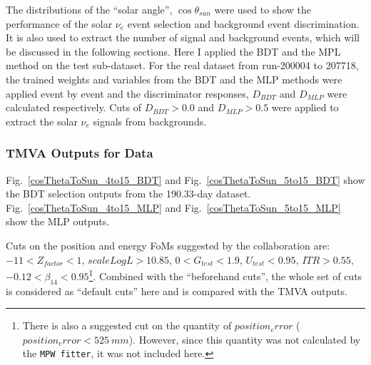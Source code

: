 The distributions of the ``solar angle'', $\cos\theta_{sun}$ were used to show the performance of the solar $\nu_e$ event selection and background event discrimination. It is also used to extract the number of signal and background events, which will be discussed in the following sections. Here I applied the BDT and the MPL method on the test sub-dataset. For the real dataset from run-200004 to 207718, the trained weights and variables from the BDT and the MLP methods were applied event by event and the discriminator responses, $D_{BDT}$ and $D_{MLP}$ were calculated respectively. Cuts of $D_{BDT}>0.0$ and $D_{MLP}>0.5$ were applied to extract the solar $\nu_e$ signals from backgrounds. 
 

%

\subsubsection{TMVA Outputs for Data}

Fig.~\ref{cosThetaToSun_4to15_BDT} and Fig.~\ref{cosThetaToSun_5to15_BDT} show the BDT selection outputs from the 190.33-day dataset. Fig.~\ref{cosThetaToSun_4to15_MLP} and Fig.~\ref{cosThetaToSun_5to15_MLP} show the MLP outputs. 


Cuts on the position and energy FoMs suggested by the collaboration\cite{morganFOM} are: $-11<Z_{factor}<1$, $scaleLogL>10.85$, $0<G_{test}<1.9$, $U_{test}<0.95$, $ITR>0.55$, $-0.12<\beta_{14}<0.95$\footnote{There is also a suggested cut on the quantity of $position_error$ ($position_error<525~mm$). However, since this quantity was not calculated by the \texttt{MPW fitter}, it was not included here.}. Combined with the ``beforehand cuts'', the whole set of cuts is considered as ``default cuts'' here and is compared with the TMVA outputs.

